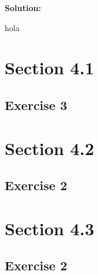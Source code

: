 \documentclass{article}
\begin{document}
\textbf{Solution:}

hola
\section{Section 4.1}
\subsection{Exercise 3}
\section{Section 4.2}
\subsection{Exercise 2}
\section{Section 4.3}
\subsection{Exercise 2}
\end{document}
